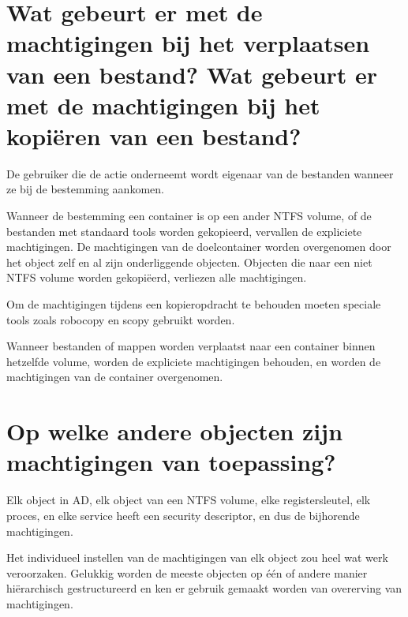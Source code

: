 \section{Wat gebeurt er met de machtigingen bij het verplaatsen van een bestand?
Wat gebeurt er met de machtigingen bij het kopiëren van een bestand?}

De gebruiker die de actie onderneemt wordt eigenaar van de bestanden wanneer ze
bij de bestemming aankomen.

Wanneer de bestemming een container is op een ander NTFS volume, of de bestanden
met standaard tools worden gekopieerd, vervallen de expliciete machtigingen. De
machtigingen van de doelcontainer worden overgenomen door het object zelf en al
zijn onderliggende objecten. Objecten die naar een niet NTFS volume worden
gekopiëerd, verliezen alle machtigingen.

Om de machtigingen tijdens een kopieropdracht te behouden moeten speciale tools
zoals robocopy en scopy gebruikt worden.

Wanneer bestanden of mappen worden verplaatst naar een container binnen
hetzelfde volume, worden de expliciete machtigingen behouden, en worden de
machtigingen van de container overgenomen.

\section{Op welke andere objecten zijn machtigingen van toepassing?}

Elk object in AD, elk object van een NTFS volume, elke registersleutel, elk
proces, en elke service heeft een security descriptor, en dus de bijhorende
machtigingen.

Het individueel instellen van de machtigingen van elk object zou heel wat werk
veroorzaken. Gelukkig worden de meeste objecten op één of andere manier
hiërarchisch gestructureerd en ken er gebruik gemaakt worden van overerving van
machtigingen.
